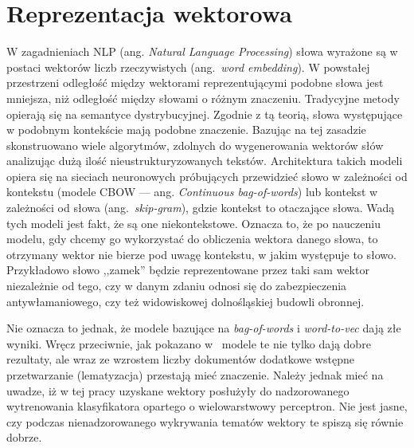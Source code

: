 
\chapter{Reprezentacja wektorowa}\label{sec:vectors}
	W zagadnieniach NLP (ang. \emph{Natural Language Processing}) słowa wyrażone są w postaci wektorów liczb rzeczywistych (ang.\ \emph{word embedding}).
	W powstałej przestrzeni odległość między wektorami reprezentującymi podobne słowa jest mniejsza, niż odległość między słowami o różnym znaczeniu.
	Tradycyjne metody opierają się na semantyce dystrybucyjnej.
	Zgodnie z tą teorią, słowa występujące w podobnym kontekście mają podobne znaczenie\cite{distributional_semantics}.
	Bazując na tej zasadzie skonstruowano wiele algorytmów, zdolnych do wygenerowania wektorów słów analizując dużą ilość nieustrukturyzowanych tekstów.
	Architektura takich modeli opiera się na sieciach neuronowych próbujących przewidzieć słowo w zależności od kontekstu
		(modele CBOW --- ang. \emph{Continuous bag-of-words}) lub kontekst w zależności od słowa (ang.\ \emph{skip-gram})\cite{word2vec}, gdzie kontekst to otaczające słowa.
	Wadą tych modeli jest fakt, że są one niekontekstowe.
	Oznacza to, że po nauczeniu modelu, gdy chcemy go wykorzystać do obliczenia wektora danego słowa, to otrzymany wektor nie bierze pod uwagę kontekstu, w jakim występuje to słowo.
	Przykładowo słowo ,,zamek'' będzie reprezentowane przez taki sam wektor niezależnie od tego,
		czy w danym zdaniu odnosi się do zabezpieczenia antywłamaniowego, czy też widowiskowej dolnośląskiej budowli obronnej.

	Nie oznacza to jednak, że modele bazujące na \emph{bag-of-words} i \emph{word-to-vec} dają złe wyniki.
	Wręcz przeciwnie, jak pokazano w~\cite{BoW_PL} modele te nie tylko dają dobre rezultaty,
		ale wraz ze wzrostem liczby dokumentów dodatkowe wstępne przetwarzanie (lematyzacja) przestają mieć znaczenie.
	Należy jednak mieć na uwadze, iż w tej pracy uzyskane wektory posłużyły do nadzorowanego wytrenowania klasyfikatora opartego o wielowarstwowy perceptron.
	Nie jest jasne, czy podczas nienadzorowanego wykrywania tematów wektory te spiszą się równie dobrze.
	
